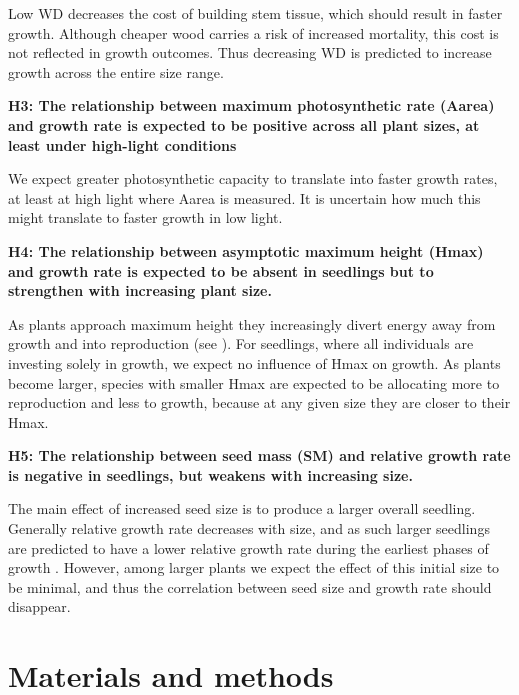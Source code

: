 \documentclass[a4paper]{article}\usepackage[]{graphicx}\usepackage[]{color}
\begin{document}
Low WD decreases the cost of building stem tissue, which should result in faster growth. Although cheaper wood carries a risk of increased mortality, this cost is not reflected in growth outcomes. Thus decreasing WD is predicted to increase growth across the entire size range.

\textbf{H3: The relationship between maximum photosynthetic rate (Aarea) and growth rate is expected to be positive across all plant sizes, at least under high-light conditions}

We expect greater photosynthetic capacity to translate into faster growth rates, at least at high light where Aarea is measured. It is uncertain how much this might translate to faster growth in low light.

\textbf{H4: The relationship between asymptotic maximum height (Hmax) and growth rate is expected to be absent in seedlings but to strengthen with increasing plant size.}

As plants approach maximum height they increasingly divert energy away from growth and into reproduction (see \citealt{Thomas:1996do, Falster:2011ii, Wenk:2014jz}). For seedlings, where all individuals are investing solely in growth, we expect no influence of Hmax on growth. As plants become larger, species with smaller Hmax are expected to be allocating more to reproduction and less to growth, because at any given size they are closer to their Hmax.

\textbf{H5: The relationship between seed mass (SM) and relative growth rate is negative in seedlings, but weakens with increasing size.}

The main effect of increased seed size is to produce a larger overall seedling. Generally relative growth rate decreases with size, and as such larger seedlings are predicted to have a lower relative growth rate during the earliest phases of growth \citet{Turnbull:2012ew}. However, among larger plants we expect the effect of this initial size to be minimal, and thus the correlation between seed size and growth rate should disappear.

\section*{Materials and methods}\label{material-and-methods}
\end{document}
